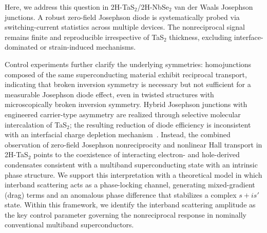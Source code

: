 \documentclass[twocolumn,secnumarabic,amssymb, nobibnotes, aps, prl, superscriptaddress]{revtex4-2}
\begin{document}
Here, we address this question in 2H-TaS$_2$/2H-NbSe$_2$ van der Waals Josephson junctions. A robust zero-field Josephson diode is systematically probed via switching-current statistics across multiple devices. 
The nonreciprocal signal remains finite and reproducible irrespective of TaS$_2$ thickness, excluding interface-dominated or strain-induced mechanisms. 

Control experiments further clarify the underlying symmetries: homojunctions composed of the same superconducting material exhibit reciprocal transport, indicating that broken inversion symmetry is necessary but not sufficient for a measurable Josephson diode effect, even in twisted structures with microscopically broken inversion symmetry.
Hybrid Josephson junctions with engineered carrier-type asymmetry are realized through selective molecular intercalation of TaS$_2$; the resulting reduction of diode efficiency is inconsistent with an interfacial charge depletion mechanism~\cite {Hu2007,mis21}. Instead, the combined observation of zero-field Josephson nonreciprocity and nonlinear Hall transport in 2H-TaS$_2$ points to the coexistence of interacting electron- and hole-derived condensates consistent with a multiband superconducting state with an intrinsic phase structure. We support this interpretation with a theoretical model in which interband scattering acts as a phase-locking channel, generating mixed-gradient (drag) terms and an anomalous phase difference that stabilizes a complex $s+is'$ state. Within this framework, we identify the interband scattering amplitude as the key control parameter governing the nonreciprocal response in nominally conventional multiband superconductors.
\end{document}
